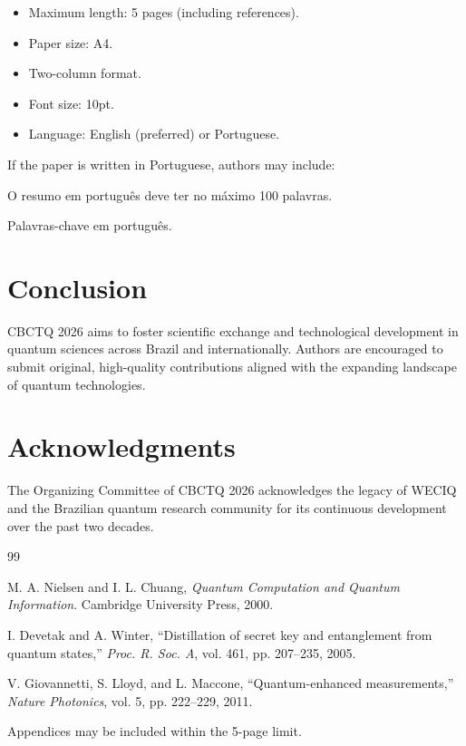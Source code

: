 \documentclass{cbctq}
\begin{document}
\begin{itemize}
    \item Maximum length: 5 pages (including references).
    \item Paper size: A4.
    \item Two-column format.
    \item Font size: 10pt.
    \item Language: English (preferred) or Portuguese.
\end{itemize}

If the paper is written in Portuguese, authors may include:

\begin{resumo}
O resumo em português deve ter no máximo 100 palavras.
\end{resumo}

\begin{chave}
Palavras-chave em português.
\end{chave}

\section{Conclusion}

CBCTQ 2026 aims to foster scientific exchange and technological development in quantum sciences across Brazil and internationally. Authors are encouraged to submit original, high-quality contributions aligned with the expanding landscape of quantum technologies.

\section*{Acknowledgments}

The Organizing Committee of CBCTQ 2026 acknowledges the legacy of WECIQ and the Brazilian quantum research community for its continuous development over the past two decades.

\begin{thebibliography}{99}

M. A. Nielsen and I. L. Chuang,
\textit{Quantum Computation and Quantum Information}.
Cambridge University Press, 2000.

I. Devetak and A. Winter,
``Distillation of secret key and entanglement from quantum states,''
\textit{Proc. R. Soc. A}, vol. 461, pp. 207–235, 2005.

V. Giovannetti, S. Lloyd, and L. Maccone,
``Quantum-enhanced measurements,''
\textit{Nature Photonics}, vol. 5, pp. 222–229, 2011.

\end{thebibliography}

\appendix
Appendices may be included within the 5-page limit.
\end{document}
